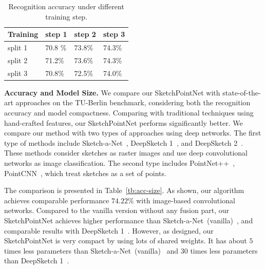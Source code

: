 \begin{table}[htbp]
\centering
\caption{Recognition accuracy under different training step.}
\label{tbl:iteration}
\begin{tabular}{l|lll}
    \hline
     Training& step 1&  step 2& step 3\\
    \hline
     split 1& 70.8 \% & 73.8\% & 74.3\% \\
     split 2& 71.2\% & 73.6\% & 74.3\% \\
     split 3& 70.8\% & 72.5\% & 74.0\% \\
    \hline
\end{tabular}
\end{table}



\noindent\textbf{Accuracy and Model Size.}
%
We compare our SketchPointNet with state-of-the-art approaches on the TU-Berlin benchmark, considering both the recognition accuracy and model compactness.
%
Comparing with traditional techniques using hand-crafted features, our SketchPointNet performs significantly better.
%
We compare our method with two types of approaches using deep networks.
The first type of methods include Sketch-a-Net~\cite{Yu2015SketchaNetTB}, DeepSketch 1~\cite{Seddati2015DeepSketchDC}, and DeepSketch 2~\cite{Dupont2016DeepSketch2D}.
These methods consider sketches as raster images and use deep convolutional networks as image classification.
The second type includes PointNet++~\cite{qi2017pointnetplusplus}, PointCNN~\cite{1801.07791}, which treat sketches as a set of points.


The comparison is presented in Table~\ref{tb:acc-size}.
As shown, our algorithm achieves comparable performance $74.22\%$ with image-based convolutional networks.
%
Compared to the vanilla version without any fusion part, our SketchPointNet achieves higher performance than Sketch-a-Net~(vanilla)~\cite{Yu2015SketchaNetTB}, and comparable results with DeepSketch 1~\cite{Seddati2015DeepSketchDC}.
However, as designed, our SketchPointNet is very compact by using lots of shared weights.
It has about $5$ times less parameters than Sketch-a-Net~(vanilla)~\cite{Yu2015SketchaNetTB} and $30$ times less parameters than DeepSketch 1~\cite{Seddati2015DeepSketchDC}.
%
%


